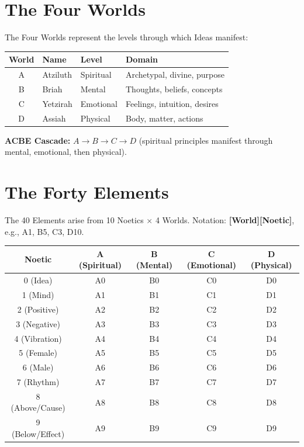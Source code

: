 \documentclass[11pt,twoside,openright]{book}
\theoremstyle{definition}
\theoremstyle{plain}
\theoremstyle{remark}
\begin{document}

\section{The Four Worlds}
\label{sec:four-worlds}

The Four Worlds represent the levels through which Ideas manifest:

\begin{center}
\begin{tabular}{clll}
\toprule
\textbf{World} & \textbf{Name} & \textbf{Level} & \textbf{Domain} \\
\midrule
A & Atziluth & Spiritual & Archetypal, divine, purpose \\
B & Briah & Mental & Thoughts, beliefs, concepts \\
C & Yetzirah & Emotional & Feelings, intuition, desires \\
D & Assiah & Physical & Body, matter, actions \\
\bottomrule
\end{tabular}
\end{center}

\textbf{ACBE Cascade:} $A \to B \to C \to D$ (spiritual principles manifest through mental, emotional, then physical).

\section{The Forty Elements}
\label{sec:forty-elements}

The 40 Elements arise from 10 Noetics $\times$ 4 Worlds. Notation: \textbf{[World][Noetic]}, e.g., A1, B5, C3, D10.

\begin{center}
\begin{tabular}{c|cccc}
\toprule
\textbf{Noetic} & \textbf{A (Spiritual)} & \textbf{B (Mental)} & \textbf{C (Emotional)} & \textbf{D (Physical)} \\
\midrule
0 (Idea) & A0 & B0 & C0 & D0 \\
1 (Mind) & A1 & B1 & C1 & D1 \\
2 (Positive) & A2 & B2 & C2 & D2 \\
3 (Negative) & A3 & B3 & C3 & D3 \\
4 (Vibration) & A4 & B4 & C4 & D4 \\
5 (Female) & A5 & B5 & C5 & D5 \\
6 (Male) & A6 & B6 & C6 & D6 \\
7 (Rhythm) & A7 & B7 & C7 & D7 \\
8 (Above/Cause) & A8 & B8 & C8 & D8 \\
9 (Below/Effect) & A9 & B9 & C9 & D9 \\
\bottomrule
\end{tabular}
\end{center}
\end{document}
